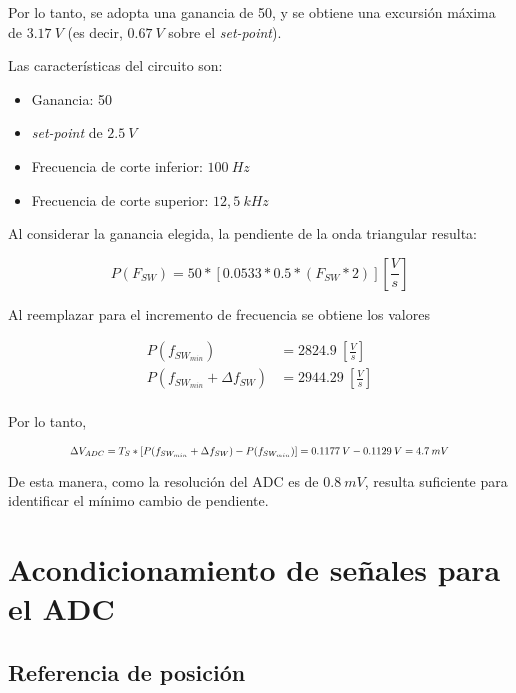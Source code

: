 \noindent Por lo tanto, se adopta una ganancia de 50, y se obtiene una excursión máxima de $3.17\:V$ (es decir, $0.67\:V$ sobre el \textsl{set-point}).


\noindent Las características del circuito son:

\begin{itemize}
	\item Ganancia: 50
	\item \textsl{set-point} de $2.5\:V$
	\item Frecuencia de corte inferior: $100\:Hz$
	\item Frecuencia de corte superior: $12,5\:kHz$
\end{itemize}

\noindent Al considerar la ganancia elegida,  la pendiente de la onda triangular resulta:

\begin{equation} 
	P(F_{SW}) = 50 * [0.0533 * 0.5 * (F_{SW}*2)][\frac{V}{s}]
\end{equation}

\noindent Al reemplazar para el incremento de frecuencia se obtiene los valores 

\begin{equation} 
	\begin{aligned}
		P(f_{SW_{min}}) &= 2824.9 \: [\frac{V}{s}]\\
		P(f_{SW_{min}} + \Delta f_{SW}) &= 2944.29 \: [\frac{V}{s}]\\		 
	\end{aligned}
\end{equation}

\noindent Por lo tanto, 


\begin{equation} 
	\resizebox{.8\hsize}{!}
	{
	$\Delta V_{ADC} = T_S * [P(f_{SW_{min}} + \Delta f_{SW}) - P(f_{SW_{min}})] = 0.1177\:V - 0.1129\:V = 4.7\:mV$
	}
\end{equation}


\noindent De esta manera, como la resolución del ADC es de $0.8\:mV$, resulta suficiente para identificar el mínimo cambio de pendiente.


\section{Acondicionamiento de señales para el ADC}

\subsection{Referencia de posición}

